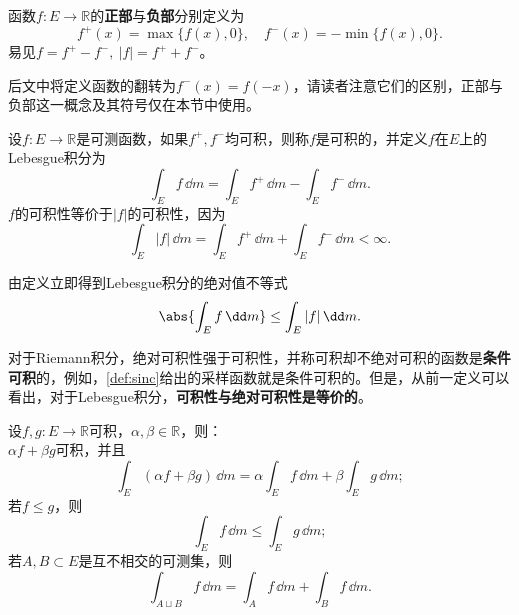 \begin{definition}[函数的正部与负部]
    函数$f:E\to\mathbb{R}$的\textbf{正部}与\textbf{负部}分别定义为
    \begin{equation}
        f^+(x)=\max\{f(x),0\},\quad f^-(x)=-\min\{f(x),0\}.
    \end{equation}
    易见$f=f^+-f^-,\ |f|=f^++f^-$。
\end{definition}
后文中将定义函数的翻转为$f^-(x)=f(-x)$，请读者注意它们的区别，正部与负部这一概念及其符号仅在本节中使用。

\begin{definition}[可测函数的Lebesgue积分]
    设$f:E\to\mathbb{R}$是可测函数，如果$f^+,f^-$均可积，则称$f$是可积的，并定义$f$在$E$上的Lebesgue积分为
    \begin{equation}
        \int_{E}f\,\dd m=\int_{E}f^+\,\dd m-\int_{E}f^-\,\dd m.
    \end{equation}
    $f$的可积性等价于$|f|$的可积性，因为
    \begin{equation}
        \int_{E}|f|\,\dd m=\int_{E}f^+\,\dd m+\int_{E}f^-\,\dd m<\infty.
    \end{equation}
\end{definition}

由定义立即得到Lebesgue积分的绝对值不等式
\begin{equation}
    \abs{\int_{E}f\,\dd m}\leq \int_{E}|f|\,\dd m.
\end{equation}

对于Riemann积分，绝对可积性强于可积性，并称可积却不绝对可积的函数是\textbf{条件可积}的，例如，\cref{def:sinc}给出的采样函数就是条件可积的。但是，从前一定义可以看出，对于Lebesgue积分，\textbf{可积性与绝对可积性是等价的}。

\begin{proposition}[Lebesgue积分的基本性质]
    设$f,g:E\to\mathbb{R}$可积，$\alpha,\beta\in\mathbb{R}$，则：\\
     $\alpha f+\beta g$可积，并且
    \begin{equation}
        \int_E(\alpha f+\beta g)\,\dd m=\alpha\int_E f\,\dd m+\beta\int_E g\,\dd m;
    \end{equation}
     若$f\leq g$，则
    \begin{equation}
        \int_E f\,\dd m\leq\int_E g\,\dd m;
    \end{equation}
     若$A,B\subset E$是互不相交的可测集，则
    \begin{equation}
        \int_{A\sqcup B}f\,\dd m=\int_A f\,\dd m+\int_B f\,\dd m.
    \end{equation}
\end{proposition}

